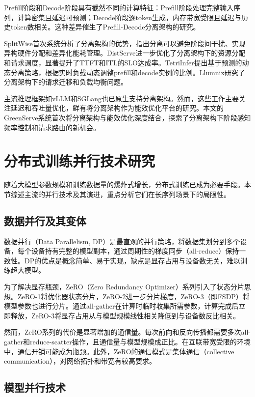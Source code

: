 Prefill阶段和Decode阶段具有截然不同的计算特征：Prefill阶段处理完整输入序列，计算密集且延迟可预测；Decode阶段逐token生成，内存带宽受限且延迟与历史token数相关。这种差异催生了Prefill-Decode分离架构的研究。

SplitWise\cite{patel2024splitwise}首次系统分析了分离架构的优势，指出分离可以避免阶段间干扰、实现异构硬件分配和差异化能耗管理。DistServe\cite{zhong2024distserve}进一步优化了分离架构下的资源分配和请求调度，显著提升了TTFT和ITL的SLO达成率。TetriInfer\cite{hu2024inference}提出基于预测的动态分离策略，根据实时负载动态调整prefill和decode实例的比例。Llumnix\cite{sun2024llumnix}研究了分离架构下的请求迁移和负载均衡问题。

主流推理框架如vLLM\cite{kwon2023efficient}和SGLang\cite{zheng2024sglang}也已原生支持分离架构。然而，这些工作主要关注延迟和吞吐量优化，鲜有将分离架构作为能效优化平台的研究。本文的GreenServe系统首次将分离架构与能效优化深度结合，探索了分离架构下阶段感知频率控制和请求路由的新机会。

\section{分布式训练并行技术研究}

随着大模型参数规模和训练数据量的爆炸式增长，分布式训练已成为必要手段。本节综述主流的并行技术及其演进，重点分析它们在长序列场景下的局限性。

\subsection{数据并行及其变体}

数据并行（Data Parallelism, DP）是最直观的并行策略，将数据集划分到多个设备，每个设备持有完整的模型副本，通过周期性的梯度同步（all-reduce）保持一致性。DP的优点是概念简单、易于实现，缺点是显存占用与设备数无关，难以训练超大模型。

为了解决显存瓶颈，ZeRO（Zero Redundancy Optimizer）系列\cite{rajbhandari2020zero,zhao2023pytorch}引入了状态分片思想。ZeRO-1将优化器状态分片，ZeRO-2进一步分片梯度，ZeRO-3（即FSDP）将模型参数也进行分片。通过all-gather在计算时临时收集所需参数，计算完成后立即释放，ZeRO-3将显存占用从与模型规模线性相关降低到与设备数反比相关。

然而，ZeRO系列的代价是显著增加的通信量。每次前向和反向传播都需要多次all-gather和reduce-scatter操作，且通信量与模型规模成正比。在互联带宽受限的环境中，通信开销可能成为瓶颈。此外，ZeRO的通信模式是集体通信（collective communication），对网络拓扑和带宽有较高要求。

\subsection{模型并行技术}

